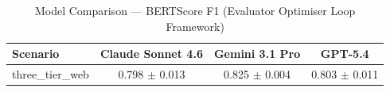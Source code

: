 \begin{table}[htbp]
\centering
\caption{Model Comparison — BERTScore F1 (Evaluator Optimiser Loop Framework)}
\label{tab:model_bert_score_f1}
\begin{tabular}{lccc}
\toprule
Scenario & Claude Sonnet 4.6 & Gemini 3.1 Pro & GPT-5.4 \\
\midrule
three\_tier\_web & 0.798 $\pm$ 0.013 & 0.825 $\pm$ 0.004 & 0.803 $\pm$ 0.011 \\
\bottomrule
\end{tabular}
\end{table}
